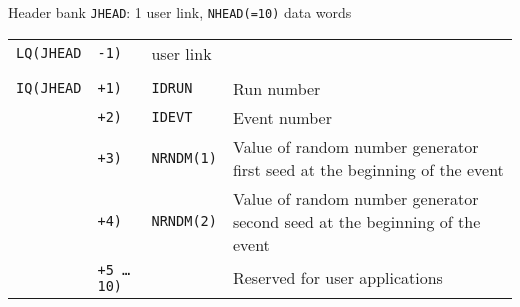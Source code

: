 Header bank {\tt JHEAD}: 1 user link, {\tt NHEAD(=10)} data words
\vspace{0.7cm}
 
\begin{tabular}{r@{}lll}
\hspace{2cm} {\tt LQ(JHEAD} &{\tt-1)} &user link      \\
                                                       \\
{\tt IQ(JHEAD}&{\tt+1)} &{\tt IDRUN} &Run number         \\
&{\tt+2)} &{\tt IDEVT} &Event number                  \\
&{\tt+3)} &{\tt NRNDM(1)} &\parbox[t]{8.1cm}{Value of random number generator 
first seed at the beginning of the event} \\
&{\tt+4)} &{\tt NRNDM(2)} &\parbox[t]{8.1cm}{Value of random number generator 
second seed at the beginning of the event} \\
&{\tt+5 \dots 10)} & & Reserved for user applications         \\
\end{tabular}
